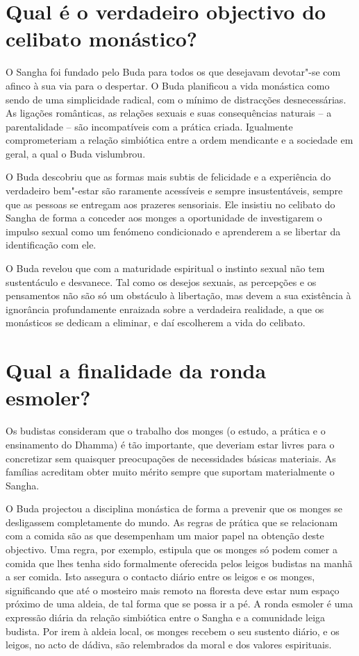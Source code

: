 \section{Qual é o verdadeiro objectivo do celibato monástico?}

O Sangha foi fundado pelo Buda para todos os que desejavam devotar"-se
com afinco à sua via para o despertar. O Buda planificou a vida
monástica como sendo de uma simplicidade radical, com o mínimo de
distracções desnecessárias. As ligações românticas, as relações sexuais
e suas consequências naturais -- a parentalidade -- são incompatíveis
com a prática criada. Igualmente comprometeriam a relação simbiótica
entre a ordem mendicante e a sociedade em geral, a qual o Buda
vislumbrou.

O Buda descobriu que as formas mais subtis de felicidade e a experiência
do verdadeiro bem"-estar são raramente acessíveis e sempre
insustentáveis, sempre que as pessoas se entregam aos prazeres
sensoriais. Ele insistiu no celibato do Sangha de forma a conceder aos
monges a oportunidade de investigarem o impulso sexual como um fenómeno
condicionado e aprenderem a se libertar da identificação com ele.

O Buda revelou que com a maturidade espiritual o instinto sexual não tem
sustentáculo e desvanece. Tal como os desejos sexuais, as percepções e
os pensamentos não são só um obstáculo à libertação, mas devem a sua
existência à ignorância profundamente enraizada sobre a verdadeira
realidade, a que os monásticos se dedicam a eliminar, e daí escolherem a
vida do celibato.

\section{Qual a finalidade da ronda esmoler?}

Os budistas consideram que o trabalho dos monges (o estudo, a prática e
o ensinamento do Dhamma) é tão importante, que deveriam estar livres
para o concretizar sem quaisquer preocupações de necessidades básicas
materiais. As famílias acreditam obter muito mérito sempre que suportam
materialmente o Sangha.

O Buda projectou a disciplina monástica de forma a prevenir que os
monges se desligassem completamente do mundo. As regras de prática que
se relacionam com a comida são as que desempenham um maior papel na
obtenção deste objectivo. Uma regra, por exemplo, estipula que os monges
só podem comer a comida que lhes tenha sido formalmente oferecida pelos
leigos budistas na manhã a ser comida. Isto assegura o contacto diário
entre os leigos e os monges, significando que até o mosteiro mais remoto
na floresta deve estar num espaço próximo de uma aldeia, de tal forma
que se possa ir a pé. A ronda esmoler é uma expressão diária da relação
simbiótica entre o Sangha e a comunidade leiga budista. Por irem à
aldeia local, os monges recebem o seu sustento diário, e os leigos, no
acto de dádiva, são relembrados da moral e dos valores espirituais.

